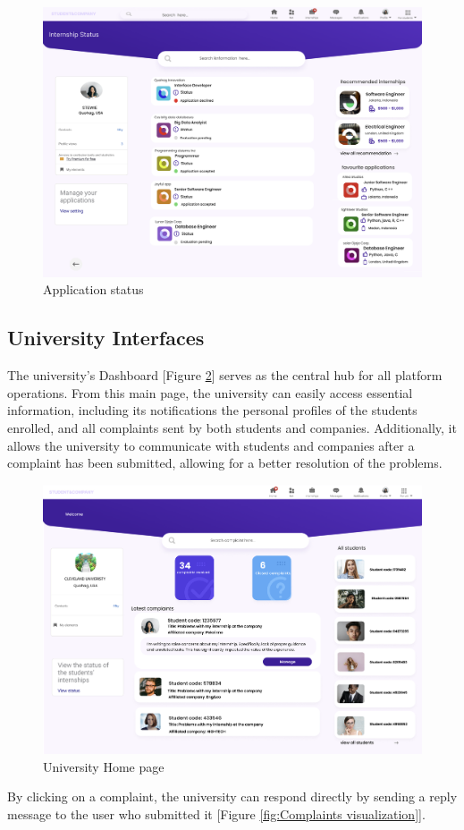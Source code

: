 \begin{figure} [H]
    \centering
    \includegraphics[width=0.5\linewidth]{Images/Interface Images/student interface/Screenshot 2024-12-12 050031.png}
    \caption{Application status}
    \label{fig:Application status}
\end{figure}

\subsection{University Interfaces}


The university's Dashboard [Figure \ref{fig: University Home page}] serves as the central hub for all platform operations. From this main page, the university can easily access essential information, including its notifications the personal profiles of the students enrolled, and all complaints sent by both students and companies. Additionally, it allows the university to communicate with students and companies after a complaint has been submitted, allowing for a better resolution of the problems.

\begin{figure} [H]
    \centering
    \includegraphics[width=0.5\linewidth]{Images/Interface Images/university interface/Screenshot 2024-12-12 045335.png}
    \caption{University Home page}
    \label{fig: University Home page}
\end{figure}


By clicking on a complaint, the university can respond directly by sending a reply message to the user who submitted it [Figure \ref{fig:Complaints visualization}].

